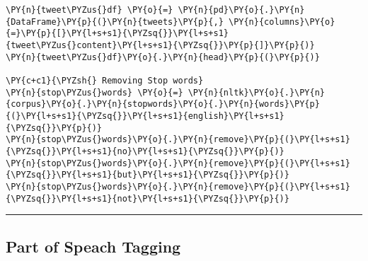 \begin{tcolorbox}[breakable, size=fbox, boxrule=1pt, pad at break*=1mm,colback=cellbackground, colframe=cellborder]
\begin{Verbatim}[commandchars=\\\{\}]
\PY{n}{tweet\PYZus{}df} \PY{o}{=} \PY{n}{pd}\PY{o}{.}\PY{n}{DataFrame}\PY{p}{(}\PY{n}{tweets}\PY{p}{,} \PY{n}{columns}\PY{o}{=}\PY{p}{[}\PY{l+s+s1}{\PYZsq{}}\PY{l+s+s1}{tweet\PYZus{}content}\PY{l+s+s1}{\PYZsq{}}\PY{p}{]}\PY{p}{)}
\PY{n}{tweet\PYZus{}df}\PY{o}{.}\PY{n}{head}\PY{p}{(}\PY{p}{)}

\PY{c+c1}{\PYZsh{} Removing Stop words}
\PY{n}{stop\PYZus{}words} \PY{o}{=} \PY{n}{nltk}\PY{o}{.}\PY{n}{corpus}\PY{o}{.}\PY{n}{stopwords}\PY{o}{.}\PY{n}{words}\PY{p}{(}\PY{l+s+s1}{\PYZsq{}}\PY{l+s+s1}{english}\PY{l+s+s1}{\PYZsq{}}\PY{p}{)}
\PY{n}{stop\PYZus{}words}\PY{o}{.}\PY{n}{remove}\PY{p}{(}\PY{l+s+s1}{\PYZsq{}}\PY{l+s+s1}{no}\PY{l+s+s1}{\PYZsq{}}\PY{p}{)}
\PY{n}{stop\PYZus{}words}\PY{o}{.}\PY{n}{remove}\PY{p}{(}\PY{l+s+s1}{\PYZsq{}}\PY{l+s+s1}{but}\PY{l+s+s1}{\PYZsq{}}\PY{p}{)}
\PY{n}{stop\PYZus{}words}\PY{o}{.}\PY{n}{remove}\PY{p}{(}\PY{l+s+s1}{\PYZsq{}}\PY{l+s+s1}{not}\PY{l+s+s1}{\PYZsq{}}\PY{p}{)}
\end{Verbatim}
\end{tcolorbox}

    \begin{center}\rule{0.5\linewidth}{0.5pt}\end{center}

    \hypertarget{part-of-speach-tagging}{%
\subsection{Part of Speach Tagging}\label{part-of-speach-tagging}}

